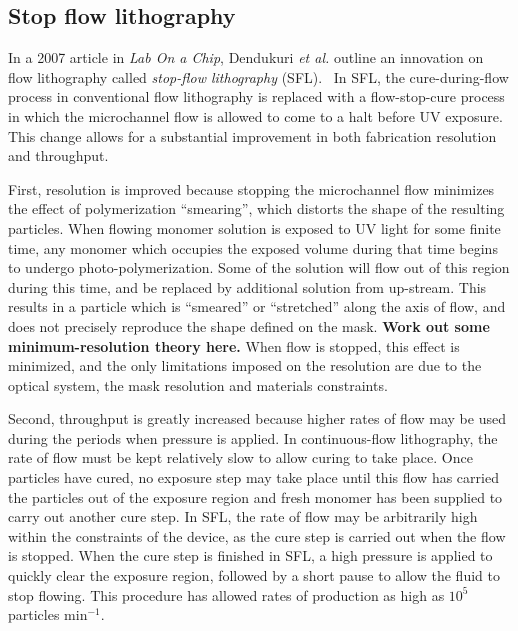 \subsection{Stop flow lithography}
\label{sec:SFL}

In a 2007 article in \textit{Lab On a Chip}, Dendukuri \textit{et al.} outline an innovation on flow lithography
called \textit{stop-flow lithography} (SFL).~\cite{dendukuri-sfl} In SFL, the cure-during-flow
 
process in conventional flow lithography is replaced with a flow-stop-cure process in which the microchannel flow
is allowed to come to a halt before UV exposure. This change allows for a substantial improvement in both 
fabrication resolution and throughput.

First, resolution is improved because stopping the microchannel flow minimizes the effect of polymerization
``smearing'', which distorts the shape of the resulting particles.
When flowing monomer solution is exposed to UV light for some finite time, any monomer which occupies the exposed volume 
during that time begins to undergo photo-polymerization.  Some of the solution will flow out of this region 
during this time, and be replaced by additional solution from up-stream. This results in a particle which is ``smeared''
or ``stretched'' along the axis of flow, and does not precisely reproduce the shape defined on the mask.  
\textbf{Work out some minimum-resolution theory here.}
When flow is 
stopped, this effect is minimized, and the only limitations imposed on the resolution are due to the optical system,
the mask resolution and materials constraints.

Second, throughput is greatly increased because higher rates of flow may be used during the periods when pressure is
applied.  In continuous-flow lithography, the rate of flow must be kept relatively slow to allow curing to take place.
Once particles have cured, no exposure step may take place until this flow has carried the particles out of the
exposure region and fresh monomer has been supplied to carry out another cure step.  In SFL, the rate of flow
may be arbitrarily high within the constraints of the device, as the cure step is carried out when the flow is stopped. 
When the cure step is finished in SFL, a high pressure is applied to quickly clear the exposure region, followed by a 
short pause to allow the fluid to stop flowing.  This procedure has allowed rates of production as high as 
$10^5$ particles min$^{-1}$.~\cite{dendukuri-sfl}

